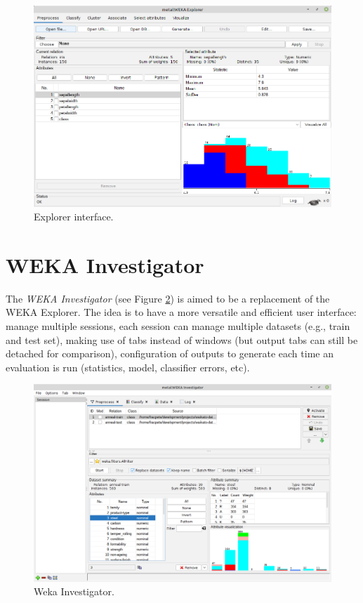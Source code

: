 \begin{figure}[htb]
  \centering
  \includegraphics[width=12.0cm]{images/explorer.png}
  \caption{Explorer interface.}
  \label{explorer}
\end{figure}

\clearpage
\section{WEKA Investigator}
The \textit{WEKA Investigator} (see Figure \ref{wekainvestigator}) is aimed
to be a replacement of the WEKA Explorer. The idea is to have a more versatile
and efficient user interface: manage multiple sessions, each session can manage
multiple datasets (e.g., train and test set), making use of tabs instead of windows
(but output tabs can still be detached for comparison), configuration of
outputs to generate each time an evaluation is run (statistics, model,
classifier errors, etc).

\begin{figure}[htb]
  \centering
  \includegraphics[width=12.0cm]{images/wekainvestigator.png}
  \caption{Weka Investigator.}
  \label{wekainvestigator}
\end{figure}

